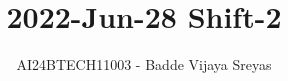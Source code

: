 \documentclass[journal]{IEEEtran}
\begin{document}

\vspace{3cm}

\title{2022-Jun-28 Shift-2}
\author{AI24BTECH11003 - Badde Vijaya Sreyas}
{\let\newpage\relax\maketitle}

\renewcommand{\thefigure}{\theenumi}
\renewcommand{\thetable}{\theenumi}
\setlength{\intextsep}{10pt} %


\renewcommand{\thetable}{\theenumi}
\end{document}
